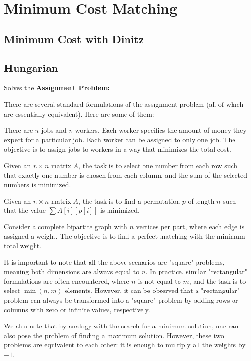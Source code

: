 \section{Minimum Cost Matching}
	
	\subsection{Minimum Cost with Dinitz}


	\subsection{Hungarian}

		Solves the \textbf{Assignment Problem:}

		There are several standard formulations of the assignment problem (all of which are essentially equivalent). Here are some of them:

		There are $n$ jobs and $n$ workers. Each worker specifies the amount of money they expect for a particular job.
		Each worker can be assigned to only one job. The objective is to assign jobs to workers in a way that minimizes the total cost.

		Given an $n \times n$ matrix $A$, the task is to select one number from each row such that exactly 
		one number is chosen from each column, and the sum of the selected numbers is minimized.

		Given an $n \times n$ matrix $A$, the task is to find a permutation $p$ of length $n$ such that the value
		$\sum A[i]\left[p[i]\right]$ is minimized.

		Consider a complete bipartite graph with $n$ vertices per part, where each edge is assigned a weight.
		The objective is to find a perfect matching with the minimum total weight.

		It is important to note that all the above scenarios are "square" problems, meaning both dimensions are always equal to
		$n$. In practice, similar "rectangular" formulations are often encountered, where $n$ is not equal to 
		$m$, and the task is to select $\min(n,m)$ elements. However, it can be observed that a "rectangular" 
		problem can always be transformed into a "square" problem by adding rows or columns with zero or infinite values, respectively.

		We also note that by analogy with the search for a minimum solution, one can also pose the problem of finding a maximum solution. 
		However, these two problems are equivalent to each other: it is enough to multiply all the weights by $-1$.

